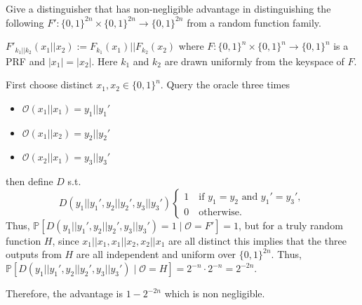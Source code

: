 \documentclass[12pt, letterpaper]{article}
\renewcommand{\P}{\mathbb{P}}
\renewcommand{\t}[1]{\text{#1}}
\begin{document}
\begin{problem}{}
    Give a distinguisher that has non-negligible advantage in distinguishing the
following $F' : \{0, 1\}^{2n} \times \{0, 1\}^{2n} \to \{0, 1\}^{2n}$ from a random function family.

\phantom{text}

$F'_{k_1||k_2} (x_1||x_2) := F_{k_1} (x_1)|| F_{k_2} (x_2)$ where $F : \{0, 1\}^n \times \{0, 1\}^n \to \{0, 1\}^n$ is a PRF and
$|x_1| = |x_2|$. Here $k_1$ and $k_2$ are drawn uniformly from the keyspace of $F$.
\end{problem}
\begin{problemproof}
    First choose distinct $x_1,x_2 \in \{0,1\}^n$. Query the oracle three times
    \begin{itemize}
        \item $\mathcal{O}(x_1 || x_1) = y_1 || y_1'$
        \item $\mathcal{O}(x_1 || x_2) = y_2 || y_2'$
        \item $\mathcal{O}(x_2 || x_1) = y_3 || y_3'$
    \end{itemize}
    then define $D$ s.t.
    \[D(y_1||y_1', y_2|| y_2', y_3||y_3') \begin{cases*}
        1 \quad \t{if } y_1=y_2 \t{ and } y_1' = y_3',\\
        0 \quad \t{otherwise}.
    \end{cases*}\]
    Thus, $\P[D(y_1||y_1', y_2|| y_2', y_3||y_3')=1 \mid \mathcal{O}=F']=1$, but for a truly random function $H$, since
    $x_1 || x_1, x_1 || x_2, x_2 || x_1$ are all distinct this implies that the three outputs from $H$ are all independent and uniform over $\{0,1\}^{2n}$.
    Thus, $\P[D(y_1||y_1', y_2|| y_2', y_3||y_3') \mid \mathcal{O}=H]=2^{-n} \cdot 2^{-n}=2^{-2n}$.

    Therefore, the advantage is $1-2^{-2n}$ which is non negligible.
\end{problemproof}
\end{document}
